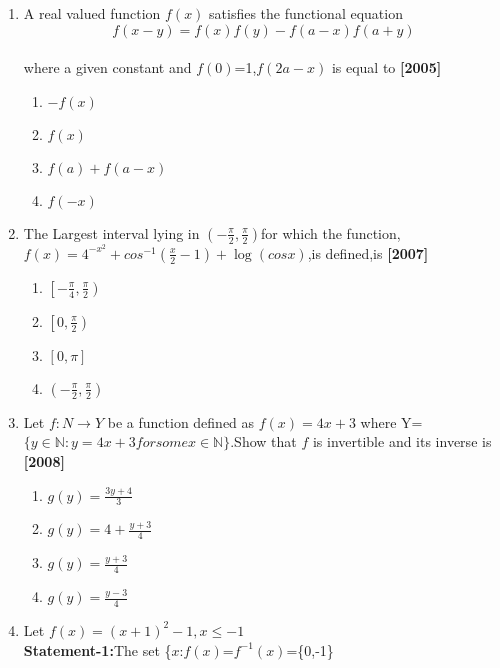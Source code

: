 \documentclass[journal,12pt,twocolumn]{IEEEtran}
\theoremstyle{remark}
\begin{document}
\begin{enumerate}[start=4]
     \item A real valued function $f(x)$ satisfies the functional equation $$f(x-y)=f(x)f(y)-f(a-x)f(a+y)$$\\
	     where a given constant and $f(0)$=1,$f(2a-x)$ is equal to \hfill \textbf{[2005]}
	     \begin{enumerate}
		     \item $-f(x)$
		     \item $f(x)$
		     \item $f(a)+f(a-x)$
		     \item $f(-x)$
	     \end{enumerate}
	     \pagebreak
     \item {\small The Largest interval lying in $\left(-\frac{\pi}{2},\frac{\pi}{2}\right)$for which the function,
	     $f(x)=4^{-x^{2}}+cos^{-1}\left(\frac{x}{2}-1\right)+\log(cosx)$,is defined,is} \hfill \textbf{[2007]}
	     \begin{enumerate}
		     \item $\left[-\frac{\pi}{4},\frac{\pi}{2}\right)$ \\
		     \item $\left[0,\frac{\pi}{2}\right)$ \\
		     \item $[0,\pi]$ \\
		     \item $\left(-\frac{\pi}{2},\frac{\pi}{2}\right)$
	     \end{enumerate}
     \item Let $f:N\to Y$ be a function defined as $f(x)=4x+3$ where Y=$\{y\in \mathbb{N}:y=4x+3 for some x\in \mathbb{N}\}$.Show that $f$ is invertible and its inverse is \hspace{3cm} \hfill  \textbf{[2008]}
	     \begin{enumerate}
		     \item $g(y)=\frac{3y+4}{3}$ \\
		     \item $g(y)=4+\frac{y+3}{4}$ \\
		     \item $g(y)=\frac{y+3}{4}$ \\
		     \item $g(y)=\frac{y-3}{4}$
	     \end{enumerate}
     \item Let $f(x)=(x+1)^{2}-1,x\leq-1$\\
	     \textbf{Statement-1:}The set \{$x$:$f(x)$=$f^{-1}(x)$=\{0,-1\}\\

\end{enumerate}
\end{document}
